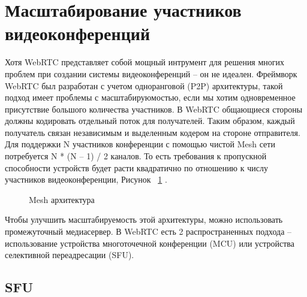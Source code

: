 \section{Масштабирование участников видеоконференций}

Хотя WebRTC представляет собой мощный интрумент для решения многих проблем при создании системы видеоконференций -- он не идеален. Фреймворк WebRTC был разработан с учетом одноранговой (P2P) архитектуры, такой подход имеет проблемы с масштабируюмостью, если мы хотим одновременное присутствие большого количества участников. В WebRTC общающиеся стороны должны кодировать отдельный поток для получателей. Таким образом, каждый получатель связан независимым и выделенным кодером на стороне отправителя. Для поддержки N участников конференции с помощью чистой Mesh сети потребуется N * (N -- 1) / 2 каналов. То есть требования к пропускной способности устройств будет расти квадратично по отношению к числу участников видеоконференции, Рисунок ~\ref{mesh} \cite{v17}.

\begin{figure}[ht]
\begin{center}

\caption{
\label{mesh}
     Mesh архитектура}
\end {center}
\end {figure}

Чтобы улучшить масштабируемость этой архитектуры, можно использовать промежуточный медиасервер. В WebRTC есть 2 распространенных подхода -- использование устройства многоточечной конференции (MCU) или устройства селективной переадресации (SFU).

\subsection{SFU}

